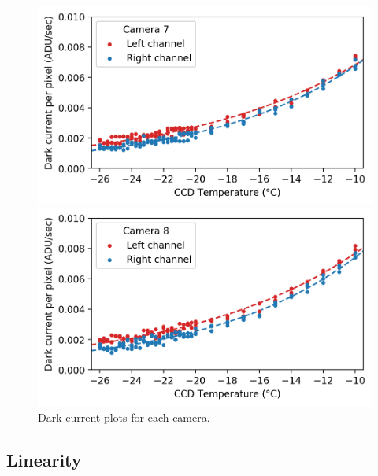 \begin{colsection}
\begin{colsection}
\begin{figure}[p]
\begin{center}
        \begin{minipage}[t]{0.49\textwidth}\vspace{10pt}
            \includegraphics[width=\linewidth]{images/detectors/dc_7.png}
        \end{minipage}
        \begin{minipage}[t]{0.49\textwidth}\vspace{10pt}
            \includegraphics[width=\linewidth]{images/detectors/dc_8.png}
        \end{minipage}
    \end{center}
    \caption[Dark current plots]{
        Dark current plots for each camera.
        }\label{fig:dcs}
\end{figure}

\clearpage

\end{colsection}

\newpage
\subsection{Linearity}
\label{sec:lin}
\begin{colsection}


\end{colsection}
\end{colsection}
